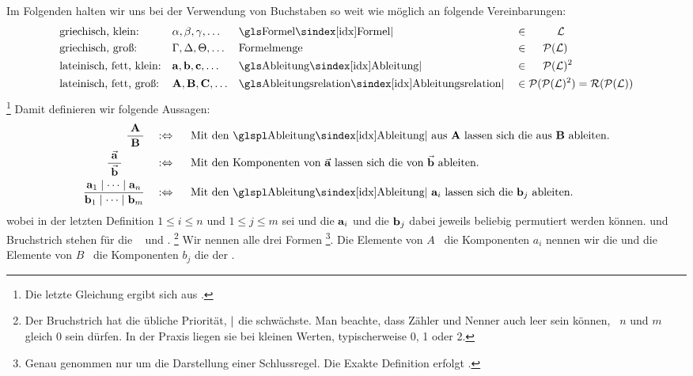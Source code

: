 %
Im Folgenden halten wir uns bei der Verwendung von Buchstaben so weit wie möglich an folgende Vereinbarungen:
\begin{align}
	&  \text{griechisch, klein:}       && \alpha, \beta, \gamma, \dots
	&& \text{\Formel}                  && \in \qquad \; \; \formulaSet
	\\
	&  \text{griechisch, groß:}        && \Gamma, \Delta, \Theta, \dots
	&& \text{Formelmenge}              && \in \quad \; \formulaSetSet
	\\
	&  \text{lateinisch, fett, klein:} && \abl{a}, \abl{b}, \abl{c}, \dots
	&& \text{\Ableitung}               && \in \quad \; \deriveSet
	\\
	&  \text{lateinisch, fett, groß:}  && \Abl{A}, \Abl{B}, \Abl{C}, \dots
	&& \text{\Ableitungsrelation}      && \in \deriveSetSet = \deriveSetRel
\end{align}
\footnote{Die letzte Gleichung ergibt sich aus .}
Damit definieren wir folgende Aussagen:
\begin{align}
	\frac{\; \Abl{A}  \;}{\; \Abl{B} \;}
	& \quad \metadefeq \quad
	\text{ Mit den \Ableitungen\ aus $\Abl{A}$ lassen sich die aus $\Abl{B}$ ableiten.}
	\label{def:AB}
	\\
	\frac{\; \vec{\abl{a}} \;}{\; \vec{\abl{b}} \;} \qquad
	& \quad \metadefeq \quad
	\text{ Mit den Komponenten von $\vec{\abl{a}}$ lassen sich die von $\vec{\abl{b}}$ ableiten.}
	\label{def:ab}
	\\
	\frac{\abl{a}_1 \srand \dots \srand \abl{a}_n}{\abl{b}_1 \srand \dots \srand \abl{b}_m}
	& \quad \metadefeq \quad
	\text{ Mit den \Ableitungen\ $\abl{a}_i$ lassen sich die $\abl{b}_j$ ableiten.}
	\label{def:aabb}
\end{align}
wobei in der letzten Definition $1 \le i \le n$ und $1 \le j \le m$ sei und die $\mathbf{a}_i$ und die $\mathbf{b}_j$ dabei jeweils beliebig permutiert werden können.
\chrqt{\symsrand} und Bruchstrich stehen für die \Metaoperationen\ \chrqt{\symmetaand} und \chrqt{\symmetaimp}.%
\footnote{%
	Der Bruchstrich hat die übliche Priorität, $\mathrel{\mid}$ die schwächste.
	Man beachte, dass Zähler und Nenner auch leer sein können, \textdh\ $n$ und $m$ gleich $0$ sein dürfen.
	In der Praxis liegen sie bei kleinen Werten, typischerweise 0, 1 oder 2.
}
Wir nennen alle drei Formen %
\footnote{%
	Genau genommen nur um die Darstellung einer Schlussregel.
	Die Exakte Definition erfolgt .
}.
Die Elemente von $A$ \textbzw\ die Komponenten $a_i$ nennen wir die  und die Elemente von $B$ \textbzw\ die Komponenten $b_j$ die  der \Schlussregel.
